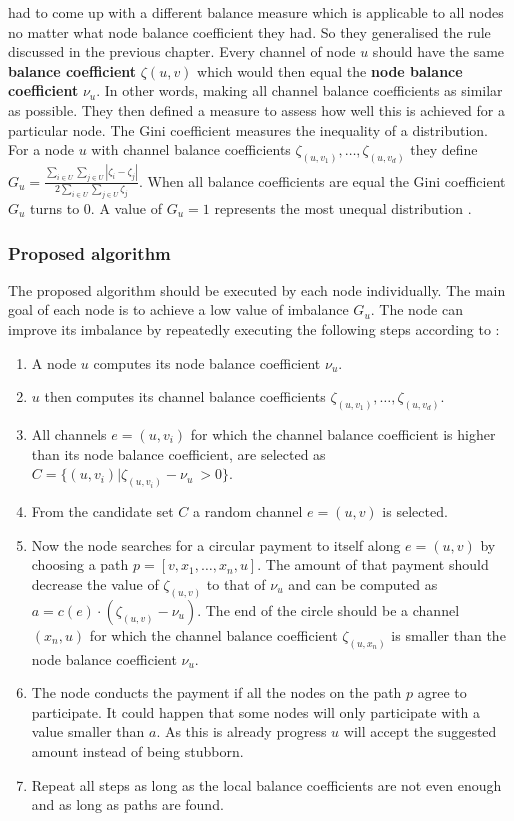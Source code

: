 \documentclass[final]{fhnwreport}       %
\begin{document}
\citeauthor{pickhardt_imbalance_2019} had to come up with a different balance measure which is applicable to all nodes no matter what node balance coefficient they had. So they generalised the rule discussed in the previous chapter. Every channel of node $u$ should have the same \textbf{balance coefficient} $\zeta{(u,v)}$ which would then equal the \textbf{node balance coefficient} $\nu_u$. In other words, making all channel balance coefficients as similar as possible. They then defined a measure to assess how well this is achieved for a particular node. The Gini coefficient measures the inequality of a distribution. For a node $u$ with channel balance coefficients $\zeta_{(u,v_1)},\dots,\zeta_{(u,v_d)}$ they define $G_u = \frac{\displaystyle{\sum_{i\in U} \sum_{j \in U}} | \zeta_i - \zeta_j |}{2 \displaystyle{\sum_{i \in U} \sum_{j \in U} \zeta_j}}$. When all balance coefficients are equal the Gini coefficient $G_u$ turns to $0$. A value of $G_u=1$ represents the most unequal distribution \citep{pickhardt_imbalance_2019}. 

\subsubsection{Proposed algorithm}\label{subsec:prop_algo}
The proposed algorithm should be executed by each node individually. The main goal of each node is to achieve a low value of imbalance $G_u$. The node can improve its imbalance by repeatedly executing the following steps according to \cite{pickhardt_imbalance_2019}:

\begin{enumerate}
\item A node $u$ computes its node balance coefficient $\nu_u$.
\item $u$ then computes its channel balance coefficients $\zeta_{(u,v_1)},\dots,\zeta_{(u,v_d)}$.
\item All channels $e=(u,v_i)$ for which the channel balance coefficient is higher 
than its node balance coefficient, are selected as $C = \{(u,v_i) | \zeta_{(u,v_i)} - \nu_u\ > 0\}$.
\item From the candidate set $C$ a random channel $e=(u,v)$ is selected.
\item Now the node searches for a circular payment to itself along $e=(u,v)$ by choosing a path $p = [v,x_1,\dots,x_n,u]$. The amount of that payment should decrease the value of $\zeta_{(u,v)}$ to that of $\nu_u$ and can be computed as $a = c(e)\cdot (\zeta_{(u,v)}-\nu_u)$. The end of the circle should be a channel $(x_n,u)$ for which the channel balance coefficient $\zeta_{(u,x_n)}$ is smaller than the node balance coefficient $\nu_u$.
\item The node conducts the payment if all the nodes on the path $p$ agree to participate. It could happen that some nodes will only participate with a value smaller than $a$. As this is already progress $u$ will accept the suggested amount instead of being stubborn. 
\item Repeat all steps as long as the local balance coefficients are not even enough and as long as paths are found.
\end{enumerate}
\end{document}
